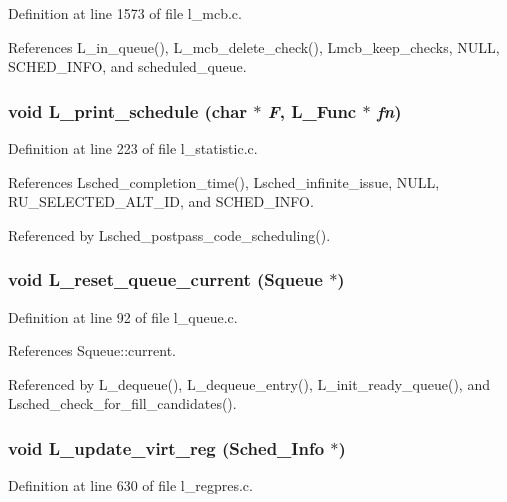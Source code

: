 Definition at line 1573 of file l\_\-mcb.c.

References L\_\-in\_\-queue(), L\_\-mcb\_\-delete\_\-check(), Lmcb\_\-keep\_\-checks, NULL, SCHED\_\-INFO, and scheduled\_\-queue.
\subsubsection{\setlength{\rightskip}{0pt plus 5cm}void L\_\-print\_\-schedule (char $\ast$ {\em F}, L\_\-Func $\ast$ {\em fn})}\label{l__schedule_8h_436ebb2a3d9d135acb6558e1920d3555}




Definition at line 223 of file l\_\-statistic.c.

References Lsched\_\-completion\_\-time(), Lsched\_\-infinite\_\-issue, NULL, RU\_\-SELECTED\_\-ALT\_\-ID, and SCHED\_\-INFO.

Referenced by Lsched\_\-postpass\_\-code\_\-scheduling().
\subsubsection{\setlength{\rightskip}{0pt plus 5cm}void L\_\-reset\_\-queue\_\-current (\bf{Squeue} $\ast$)}\label{l__schedule_8h_820fdc8d61abc9d2c1d9239521ce1dad}




Definition at line 92 of file l\_\-queue.c.

References Squeue::current.

Referenced by L\_\-dequeue(), L\_\-dequeue\_\-entry(), L\_\-init\_\-ready\_\-queue(), and Lsched\_\-check\_\-for\_\-fill\_\-candidates().
\subsubsection{\setlength{\rightskip}{0pt plus 5cm}void L\_\-update\_\-virt\_\-reg (\bf{Sched\_\-Info} $\ast$)}\label{l__schedule_8h_b7013fd5ea6dbb80ebd3e4adc3eaea25}




Definition at line 630 of file l\_\-regpres.c.

